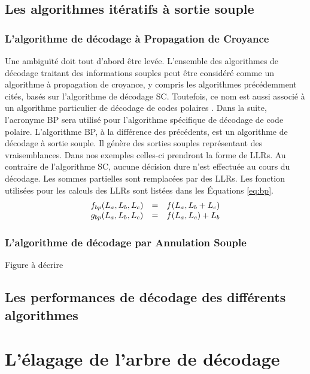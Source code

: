 \subsection{Les algorithmes itératifs à sortie souple}


\subsubsection{L'algorithme de décodage à Propagation de Croyance}
Une ambiguïté doit tout d'abord être levée. L'ensemble des algorithmes de décodage traitant des informations souples peut être considéré comme un algorithme à propagation de croyance, y compris les algorithmes précédemment cités, basés sur l'algorithme de décodage SC. Toutefois, ce nom est aussi associé à un algorithme particulier de décodage de codes polaires \cite{arikan_channel_2009}. Dans la suite, l'acronyme BP sera utilisé pour l'algorithme spécifique de décodage de code polaire. L'algorithme BP, à la différence des précédents, est un algorithme de décodage à sortie souple. Il génère des sorties souples représentant des vraisemblances. Dans nos exemples celles-ci prendront la forme de LLRs. Au contraire de l'algorithme SC, aucune décision dure n'est effectuée au cours du décodage. Les sommes partielles sont remplacées par des LLRs. Les fonction utilisées pour les calculs des LLRs sont listées dans les Équations \ref{eq:bp}.
    \begin{eqnarray}
      \begin{array}{l c l}
        f_{bp}(L_a,L_b,L_c) & = & f(L_a, L_b  + L_c) \\
        g_{bp}(L_a,L_b,L_c) & = & f(L_a, L_c) + L_b
      \end{array}
      \label{eq:bp}
    \end{eqnarray}

\subsubsection{L'algorithme de décodage par Annulation Souple}
Figure à décrire

\subsection{Les performances de décodage des différents algorithmes}

\section{L'élagage de l'arbre de décodage}

